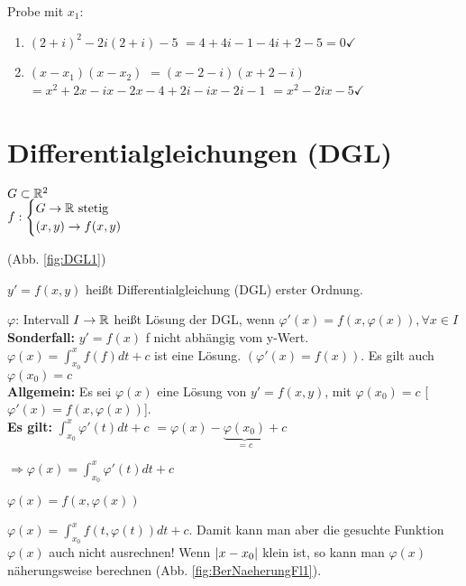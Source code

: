 Probe mit $x_1$:
\begin{enumerate}
\item $(2+i)^2 - 2i(2+i) - 5 $
$=4+4i-1-4i+2-5=0 \checkmark$
\item $(x-x_1)(x-x_2)$
$=(x-2-i)(x+2-i)$
$=x^2 + 2x - ix -2x -4 +2i -ix -2i -1$
$=x^2 -2ix -5 \checkmark$
\end{enumerate}

\section{Differentialgleichungen (DGL)}
\begin{defi}
$G \subset \mathbb{R}^2$\\
$f:
\begin{cases}
G \rightarrow \mathbb{R} \textrm{ stetig} \\
(x,y) \rightarrow f(x,y)
\end{cases}$
\end{defi} 
(Abb. \ref{fig:DGL1})

$y' = f(x,y)$ heißt Differentialgleichung (DGL) erster Ordnung. 

$\varphi$: Intervall $I \rightarrow \mathbb{R}$ heißt Lösung der DGL, wenn 
$\varphi'(x) = f(x,\varphi(x)), \forall x\in I$ \\

\textbf{Sonderfall:} $y' = f(x) $ f nicht abhängig vom y-Wert. \\
$\varphi(x) = \int_{x_0}^{x} f(f) dt + c$ ist eine Lösung. 
$(\varphi'(x) = f(x))$. Es gilt auch \underline{$\varphi(x_0)=c$}\\

\textbf{Allgemein:} Es sei $\varphi(x)$ eine Lösung von $y' = f(x,y)$, mit $\varphi(x_0)=c$ [$\varphi'(x)=f(x,\varphi(x))$].\\

\textbf{Es gilt:} 
$\int_{x_0}^{x} \varphi'(t) dt + c$
$=\varphi(x) - \underbrace{\varphi(x_0)}_{=c} + c $

$\Rightarrow \varphi(x) = \int_{x_0}^{x} \varphi'(t) dt + c$ 

$\varphi(x) = f(x,\varphi(x))$

$\varphi(x) = \int_{x_0}^{x} f(t, \varphi(t)) dt + c$. Damit kann man aber die gesuchte Funktion $\varphi(x)$ auch nicht ausrechnen! Wenn $ \left\vert x-x_0 \right\vert $ klein ist, so kann man $\varphi(x)$ näherungsweise berechnen (Abb. \ref{fig:BerNaeherungFl1}). 


